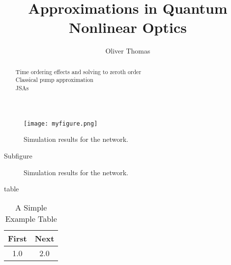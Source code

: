 \documentclass[10pt]{IEEEtran}
\begin{document}
\title{Approximations in Quantum Nonlinear Optics }
\author{Oliver Thomas}

\maketitle


\begin{abstract}
    Time ordering effects and solving to zeroth order \\
    Classical pump approximation \\
    JSAs \\
\end{abstract}






\begin{figure}[!h]
\centering
\texttt{[image: myfigure.png]}
\caption{Simulation results for the network.}
\label{fig_sim}
\end{figure}


Subfigure
\begin{figure*}[!h]
\centering
{}
\hfil
{}
\caption{Simulation results for the network.}
\label{fig_sim}
\end{figure*}

table 
\begin{table}[!h]
\renewcommand{\arraystretch}{1.3}
\caption{A Simple Example Table}
\label{table_example}
\centering
\begin{tabular}{c||c}
\hline
\bfseries First & \bfseries Next\\
\hline\hline
1.0 & 2.0\\
\hline
\end{tabular}
\end{table}
\end{document}

